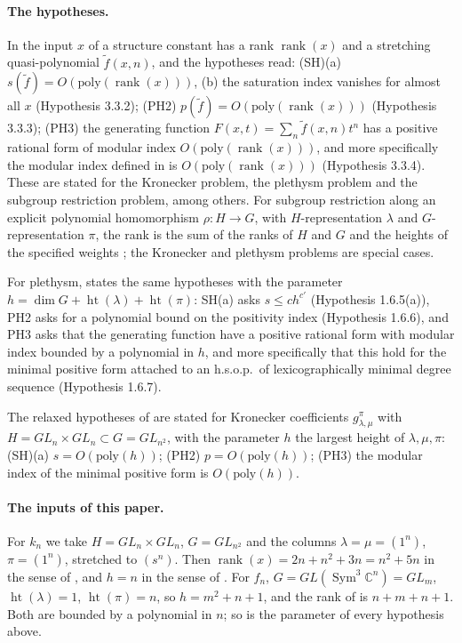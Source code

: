\documentclass[11pt,a4paper]{article}
\theoremstyle{definition}
\newcommand{\C}{\mathbb{C}}
\newcommand{\Sym}{\operatorname{Sym}}
\newcommand{\rank}{\operatorname{rank}}
\begin{document}
\paragraph{The hypotheses.}
In \cite[Section 3.3, p.~51]{GCT6} the input $x$ of a structure constant has a
rank $\rank(x)$ and a stretching quasi-polynomial $\tilde f(x,n)$, and the
hypotheses read: (SH)(a) $s(\tilde f)=O(\mathrm{poly}(\rank(x)))$, (b) the
saturation index vanishes for almost all $x$ (Hypothesis 3.3.2); (PH2)
$p(\tilde f)=O(\mathrm{poly}(\rank(x)))$ (Hypothesis 3.3.3); (PH3) the
generating function $F(x,t)=\sum_n\tilde f(x,n)t^n$ has a positive rational
form of modular index $O(\mathrm{poly}(\rank(x)))$, and more specifically the
modular index defined in \cite[Section 4.1.1]{GCT6} is
$O(\mathrm{poly}(\rank(x)))$ (Hypothesis 3.3.4). These are stated for the
Kronecker problem, the plethysm problem and the subgroup restriction problem,
among others. For subgroup restriction along an explicit polynomial
homomorphism $\rho:H\to G$, with $H$-representation $\lambda$ and
$G$-representation $\pi$, the rank is the sum of the ranks of $H$ and $G$ and
the heights of the specified weights \cite[Section 3.4, p.~52]{GCT6}; the
Kronecker and plethysm problems are special cases.

For plethysm, \cite[Section 1.6, pp.~24--25]{GCT6} states the same hypotheses
with the parameter $h=\dim G+\operatorname{ht}(\lambda)+\operatorname{ht}(\pi)$:
SH(a) asks $s\le ch^{c'}$ (Hypothesis 1.6.5(a)), PH2 asks for a polynomial
bound on the positivity index (Hypothesis 1.6.6), and PH3 asks that the
generating function have a positive rational form with modular index bounded
by a polynomial in $h$, and more specifically that this hold for the minimal
positive form attached to an h.s.o.p.\ of lexicographically minimal degree
sequence (Hypothesis 1.6.7).

The relaxed hypotheses of \cite[Appendix, pp.~19--20]{BOR} are stated for
Kronecker coefficients $g_{\lambda,\mu}^{\pi}$ with $H=GL_n\times GL_n\subset
G=GL_{n^2}$, with the parameter $h$ the largest height of $\lambda,\mu,\pi$:
(SH)(a) $s=O(\mathrm{poly}(h))$; (PH2) $p=O(\mathrm{poly}(h))$; (PH3) the
modular index of the minimal positive form is $O(\mathrm{poly}(h))$.

\paragraph{The inputs of this paper.}
For $k_n$ we take $H=GL_n\times GL_n$, $G=GL_{n^2}$ and the columns
$\lambda=\mu=(1^n)$, $\pi=(1^n)$, stretched to $(s^n)$. Then $\rank(x)=2n+n^2+3n
=n^2+5n$ in the sense of \cite[Section 3.4]{GCT6}, and $h=n$ in the sense of
\cite[Appendix]{BOR}. For $f_n$, $G=GL(\Sym^3\C^n)=GL_m$, $\operatorname{ht}
(\lambda)=1$, $\operatorname{ht}(\pi)=n$, so $h=m^2+n+1$, and the rank of
\cite[Section 3.4]{GCT6} is $n+m+n+1$. Both are bounded by a polynomial in
$n$; so is the parameter of every hypothesis above.
\end{document}
